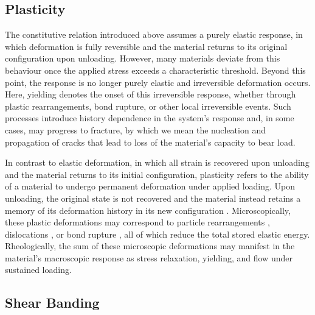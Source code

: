\subsection{Plasticity} \label{sec:Plasticity}
The constitutive relation introduced above assumes a purely elastic response, in which deformation is fully reversible and the material returns to its original configuration upon unloading. However, many materials deviate from this behaviour once the applied stress exceeds a characteristic threshold. Beyond this point, the response is no longer purely elastic and irreversible deformation occurs. Here, yielding denotes the onset of this irreversible response, whether through plastic rearrangements, bond rupture, or other local irreversible events. Such processes introduce history dependence in the system's response and, in some cases, may progress to fracture, by which we mean the nucleation and propagation of cracks that lead to loss of the material's capacity to bear load.

In contrast to elastic deformation, in which all strain is recovered upon unloading and the material returns to its initial configuration, plasticity refers to the ability of a material to undergo permanent deformation under applied loading. Upon unloading, the original state is not recovered and the material instead retains a memory of its deformation history in its new configuration \cite{lubliner2008plasticity,Simo2000-ComputationalInelasticity,Wu2004}. Microscopically, these plastic deformations may correspond to particle rearrangements \cite{falk_dynamics_1998,maloney_amorphous_2006,tanguy_plastic_2006,gartner_nonlinear_2016}, dislocations \cite{shiba_plastic_2010, ispanovity_avalanches_2014,ben-zion_earthquake_1993}, or bond rupture \cite{tauber_stretchy_2022,ducrot_toughening_2014,Creton50th2017,vernereyStatisticalDamageMechanics2018,gong_why_2010}, all of which reduce the total stored elastic energy. Rheologically, the sum of these microscopic deformations may manifest in the material's macroscopic response as stress relaxation, yielding, and flow under sustained loading.

\subsection{Shear Banding} \label{sec:ShearBanding}

